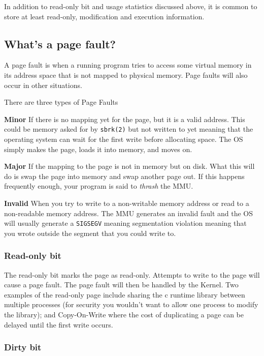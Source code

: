In addition to read-only bit and usage statistics discussed above, it is
common to store at least read-only, modification and execution
information.

\subsection{What's a page fault?}\label{whats-a-page-fault}

A page fault is when a running program tries to access some virtual
memory in its address space that is not mapped to physical memory. Page
faults will also occur in other situations.

There are three types of Page Faults

\textbf{Minor} If there is no mapping yet for the page, but it is a
valid address. This could be memory asked for by \texttt{sbrk(2)} but
not written to yet meaning that the operating system can wait for the
first write before allocating space. The OS simply makes the page, loads
it into memory, and moves on.

\textbf{Major} If the mapping to the page is not in memory but on disk.
What this will do is swap the page into memory and swap another page
out. If this happens frequently enough, your program is said to
\emph{thrash} the MMU.

\textbf{Invalid} When you try to write to a non-writable memory address
or read to a non-readable memory address. The MMU generates an invalid
fault and the OS will usually generate a \texttt{SIGSEGV} meaning
segmentation violation meaning that you wrote outside the segment that
you could write to.

\subsubsection{Read-only bit}\label{read-only-bit}

The read-only bit marks the page as read-only. Attempts to write to the
page will cause a page fault. The page fault will then be handled by the
Kernel. Two examples of the read-only page include sharing the c runtime
library between multiple processes (for security you wouldn't want to
allow one process to modify the library); and Copy-On-Write where the
cost of duplicating a page can be delayed until the first write occurs.

\subsubsection{Dirty bit}\label{dirty-bit}

